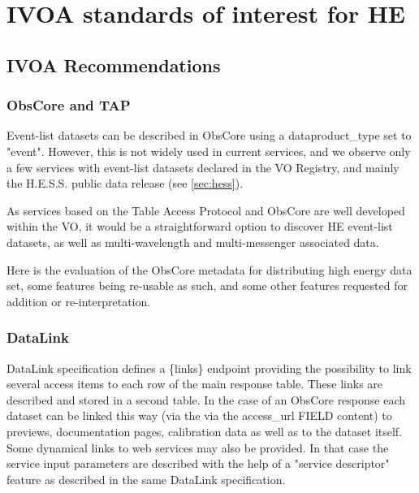\documentclass[11pt,a4paper]{ivoa}
\begin{document}
\section{IVOA standards of interest for HE}

\subsection{IVOA Recommendations}

\subsubsection{ObsCore and TAP}

Event-list datasets can be described in ObsCore using a dataproduct\_type set to "event". However, this is not widely used in current services, and we observe only a few services with event-list datasets declared in the VO Registry, and mainly the H.E.S.S. public data release (see \ref{sec:hess}).

As services based on the Table Access Protocol \citep{2019ivoa.spec.0927D} and ObsCore are well developed within the VO, it would be a straightforward option to discover HE event-list datasets, as well as multi-wavelength and multi-messenger associated data.

Here is the evaluation of the ObsCore metadata for distributing high energy data set, some features being re-usable as such, and some other features requested for addition or re-interpretation.


\subsubsection{DataLink}


DataLink specification \citep{2023ivoa.spec.1215B} defines a \{links\} endpoint providing the possibility to link several
access items to each row of the main response table. These links are described and stored in a second
table. In the case of an ObsCore response each dataset can be linked this way (via the via the access\_url
FIELD content) to previews, documentation pages, calibration data as well as to the dataset itself.
Some dynamical links to web services may also be provided. In that case the service input parameters are
described with the help of a "service descriptor" feature as described in the same DataLink specification.
\end{document}
